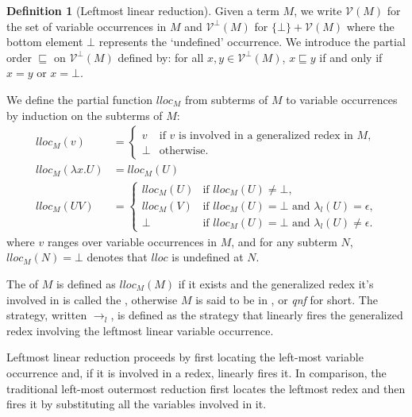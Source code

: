 \documentclass{article}
\theoremstyle{definition}
\newtheorem{definition}{Definition}[section]
\begin{document}
\begin{definition}[Leftmost linear reduction]
Given a term $M$, we write $\mathcal{V}(M)$ for the set of variable occurrences in $M$
and $\mathcal{V}^\bot(M)$ for $\{\bot \} + \mathcal{V}(M)$ where the bottom element $\bot$ represents the `undefined' occurrence. We introduce the partial order $\sqsubseteq$ on $\mathcal{V}^\bot(M)$ defined by: for all $x,y \in \mathcal{V}^\bot(M)$, $x \sqsubseteq y$ if and only if $x = y$ or $x = \bot$.

We define the partial function $lloc_M$ from subterms of $M$ to variable occurrences by induction on the subterms of $M$:
\begin{align*}
lloc_M(v) &=
    \begin{cases}
    v &\mbox{if $v$ is involved in a generalized redex in $M$,} \\
    \bot & \mbox {otherwise.}
    \end{cases}  \\
lloc_M(\lambda x . U) &= lloc_M(U) \\
lloc_M(U V) &= \begin{cases}
                lloc_M(U) &\mbox{if $lloc_M(U)\neq\bot$,} \\
                lloc_M(V) &\mbox{if $lloc_M(U)=\bot$ and $\lambda_l(U) = \epsilon$,} \\
                \bot & \mbox{if $lloc_M(U)=\bot$ and $\lambda_l(U) \neq \epsilon$.}
              \end{cases}
\end{align*}
where $v$ ranges over variable occurrences in $M$,
and for any subterm $N$, $lloc_M(N) = \bot$ denotes that $lloc$ is undefined at $N$.

The  of $M$
is defined as $lloc_M(M)$ if it exists and the generalized redex it's involved in is called the , otherwise $M$ is said to be in , or \emph{qnf} for short.
The  strategy, written $\rightarrow_l$, is defined as the strategy that linearly fires the generalized redex involving the leftmost linear variable occurrence.
\end{definition}

Leftmost linear reduction proceeds by first locating the left-most variable occurrence and, if it is involved in a redex, linearly fires it. In comparison, the traditional left-most outermost reduction first locates the leftmost redex and then fires it by substituting all the variables involved in it.
\end{document}
